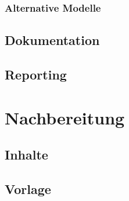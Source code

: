 			\subsubsection{Alternative Modelle}
		\subsection{Dokumentation}	            	
            	\subsection{Reporting}    	
	\section{Nachbereitung}
			\subsection{Inhalte}
			\subsection{Vorlage}